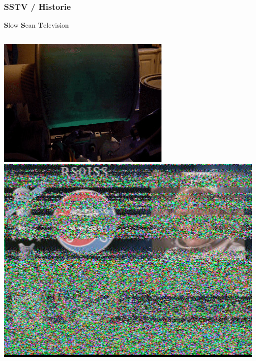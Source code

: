 \begin{frame}
    \frametitle{SSTV / Historie}

    \textbf{S}low \textbf{S}can \textbf{T}elevision\\[1.5em]


    \begin{columns}
       \includegraphics[width=\textwidth,height=.4\textheight,keepaspectratio]{e16/Mechanical_glow_drum_slow_scan_television_monitor.jpg}
       \tiny \hyperlink{refs}{\cite{wc}}
       \includegraphics[width=\textwidth,height=.4\textheight,keepaspectratio]{e16/SSTV-RS0ISS_2015-07-19.jpg}
    \end{columns}



\end{frame}
